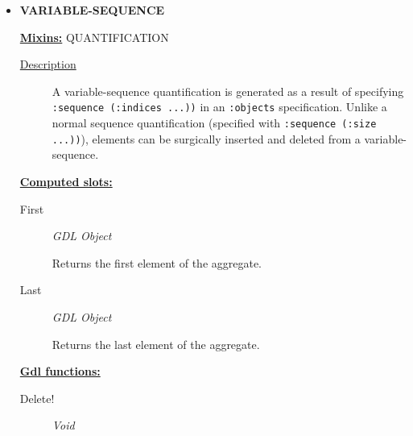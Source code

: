 \documentclass [11pt]{book}
\begin{document}
\begin{itemize}
\begin{description}
\end{description}







\item {}
\textbf{VARIABLE-SEQUENCE}


\textbf{
\underline{Mixins:}} QUANTIFICATION





\begin{description}

\item [
\underline{Description}]


A variable-sequence quantification is generated as a result of specifying 
\texttt{:sequence (:indices ...))} in an \texttt{:objects} specification. Unlike a normal sequence quantification (specified
with \texttt{:sequence (:size ...))}), elements can be surgically inserted and deleted from a variable-sequence.



\end{description}








\textbf{
\underline{Computed slots:}}

\begin{description}

\item [First]
\emph{GDL Object}

 Returns the first element of the aggregate.




\item [Last]
\emph{GDL Object}

 Returns the last element of the aggregate.




\end{description}






\textbf{
\underline{Gdl functions:}}

\begin{description}

\item [Delete!]
\emph{Void}


\end{description}
\end{itemize}
\end{document}
